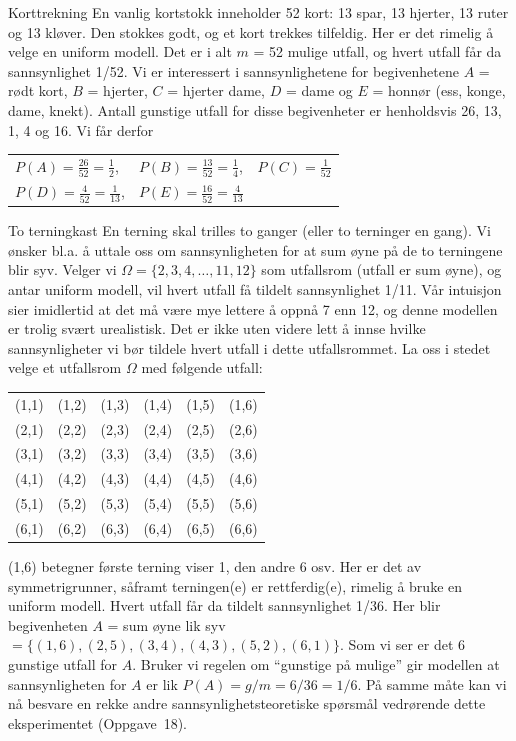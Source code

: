 \begin{eksempel}{Korttrekning}
En vanlig kortstokk inneholder 52 kort: 13 spar, 13 hjerter, 13
ruter og 13 kløver. Den stokkes godt, og et kort trekkes
tilfeldig. Her er det rimelig å velge en uniform modell. Det er i
alt $m$ = 52 mulige utfall, og hvert utfall får da sannsynlighet
1/52. Vi er interessert i sannsynlighetene for begivenhetene $A$ =
rødt kort, $B$ = hjerter, $C$ = hjerter dame, $D$ = dame og $E$ = honnør
(ess, konge, dame, knekt). Antall gunstige utfall for disse
begivenheter er henholdsvis 26, 13, 1, 4 og 16. Vi får derfor
\begin{tabular}{lll}
 $P(A)=\frac{26}{52}=\frac{1}{2}$,&$P(B)=\frac{13}{52}=\frac{1}{4}$,
                               &$P(C)=\frac{1}{52}$ \\[1mm]
 $P(D)=\frac{4}{52}=\frac{1}{13}$,&$P(E)=\frac{16}{52}=\frac{4}{13}$&      
\end{tabular}
\end{eksempel}
\begin{eksempel}{To terningkast}
En terning skal trilles to ganger (eller to terninger en gang).
Vi ønsker bl.a. å uttale oss om sannsynligheten for at sum øyne
på de to terningene blir syv. Velger vi $\Omega = \{ 2,3,4, \ldots ,
11, 12\}$ som utfallsrom (utfall er sum øyne), og antar uniform
modell, vil hvert utfall få tildelt sannsynlighet 1/11. Vår
intuisjon sier imidlertid at det må være mye lettere å oppnå 7
enn 12, og denne modellen er trolig svært urealistisk. Det er
ikke uten videre lett å innse hvilke sannsynligheter vi bør
tildele hvert utfall i dette utfallsrommet. La oss i stedet velge
et utfallsrom $\Omega$ med følgende utfall:
\begin{center}
\begin{tabular}{cccccc}
(1,1)&(1,2)&(1,3)&(1,4)&(1,5)&(1,6) \\
(2,1)&(2,2)&(2,3)&(2,4)&(2,5)&(2,6) \\
(3,1)&(3,2)&(3,3)&(3,4)&(3,5)&(3,6) \\
(4,1)&(4,2)&(4,3)&(4,4)&(4,5)&(4,6) \\
(5,1)&(5,2)&(5,3)&(5,4)&(5,5)&(5,6) \\
(6,1)&(6,2)&(6,3)&(6,4)&(6,5)&(6,6) \\
\end{tabular}
\end{center}
(1,6) betegner første terning viser 1, den andre 6 osv. Her er
det av symmetrigrunner, såframt terningen(e) er rettferdig(e),
rimelig å bruke en uniform modell. Hvert utfall får da tildelt
sannsynlighet 1/36. Her blir begivenheten $A$ = sum øyne lik syv
$=\{(1,6), (2,5), (3,4), (4,3), (5,2), (6,1)\}$. Som vi ser er
det 6 gunstige utfall for $A$. Bruker vi regelen om ``gunstige på
mulige'' gir modellen at sannsynligheten for $A$ er lik $P(A) = g/m
= 6/36 = 1/6$. På samme måte kan vi nå besvare en rekke andre
sannsynlighetsteoretiske spørsmål vedrørende dette eksperimentet
(Oppgave~18).
\end{eksempel}

